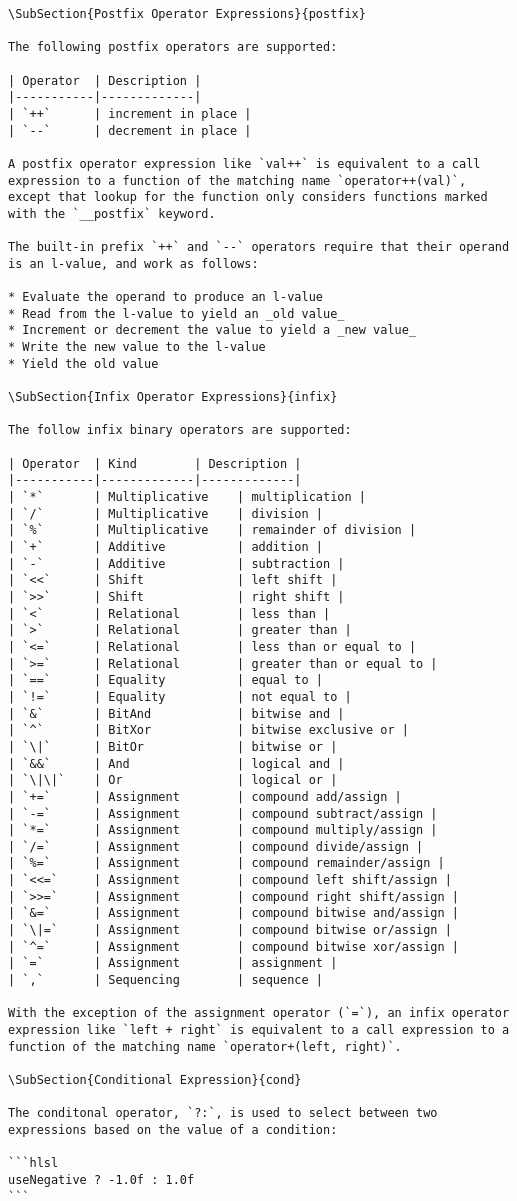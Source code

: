 \begin{verbatim}
\SubSection{Postfix Operator Expressions}{postfix}

The following postfix operators are supported:

| Operator 	| Description |
|-----------|-------------|
| `++`		| increment in place |
| `--`		| decrement in place |

A postfix operator expression like `val++` is equivalent to a call expression to a function of the matching name `operator++(val)`, except that lookup for the function only considers functions marked with the `__postfix` keyword.

The built-in prefix `++` and `--` operators require that their operand is an l-value, and work as follows:

* Evaluate the operand to produce an l-value
* Read from the l-value to yield an _old value_
* Increment or decrement the value to yield a _new value_
* Write the new value to the l-value
* Yield the old value

\SubSection{Infix Operator Expressions}{infix}

The follow infix binary operators are supported:

| Operator 	| Kind        | Description |
|-----------|-------------|-------------|
| `*`		| Multiplicative 	| multiplication |
| `/`		| Multiplicative 	| division |
| `%`		| Multiplicative 	| remainder of division |
| `+`		| Additive 			| addition |
| `-`		| Additive 			| subtraction |
| `<<`		| Shift 			| left shift |
| `>>`		| Shift 			| right shift |
| `<` 		| Relational 		| less than |
| `>`		| Relational 		| greater than |
| `<=`		| Relational 		| less than or equal to |
| `>=`		| Relational 		| greater than or equal to |
| `==`		| Equality 			| equal to |
| `!=`		| Equality 			| not equal to |
| `&`		| BitAnd 			| bitwise and |
| `^`		| BitXor			| bitwise exclusive or |
| `\|`		| BitOr 			| bitwise or |
| `&&`		| And 				| logical and |
| `\|\|`	| Or 				| logical or |
| `+=`		| Assignment  		| compound add/assign |
| `-=`      | Assignment  		| compound subtract/assign |
| `*=`      | Assignment  		| compound multiply/assign |
| `/=`      | Assignment  		| compound divide/assign |
| `%=`      | Assignment  		| compound remainder/assign |
| `<<=`     | Assignment  		| compound left shift/assign |
| `>>=`     | Assignment  		| compound right shift/assign |
| `&=`      | Assignment  		| compound bitwise and/assign |
| `\|=`     | Assignment  		| compound bitwise or/assign |
| `^=`      | Assignment  		| compound bitwise xor/assign |
| `=`       | Assignment  		| assignment |
| `,`		| Sequencing  		| sequence |

With the exception of the assignment operator (`=`), an infix operator expression like `left + right` is equivalent to a call expression to a function of the matching name `operator+(left, right)`.

\SubSection{Conditional Expression}{cond}

The conditonal operator, `?:`, is used to select between two expressions based on the value of a condition:

```hlsl
useNegative ? -1.0f : 1.0f
```
\end{verbatim}

